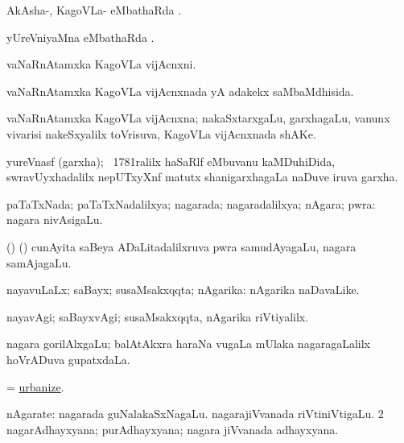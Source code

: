 \bentry
{} 
\gl{\sapUpa}
\expl{}
\bmng
AkAsha-, KagoVLa- eMbathaRda \sapUpa. 
\emng
\eentry

\bentry
{} 
\gl{\sapUpa}
\expl{}
\bmng
yUreVniyaMna eMbathaRda \sapUpa. 
\emng
\eentry

\bentry
{} 
\gl{\nA}
\expl{}
\bmng
vaNaRnAtamxka KagoVLa vijAcnxni. 
\emng
\eentry

\bentry
{} 
\gl{\gu}
\expl{}
\bmng
vaNaRnAtamxka KagoVLa vijAcnxnada yA adakekx saMbaMdhisida. 
\emng
\eentry

\bentry
{} 
\gl{\nA}
\expl{}
\bmng
vaNaRnAtamxka KagoVLa vijAcnxna; nakaSxtarxgaLu, garxhagaLu, \mo vanunx vivarisi nakeSxyalilx toVrisuva, KagoVLa vijAcnxnada shAKe. 
\emng
\eentry

\bentry
{} 
\gl{\nA}
\expl{}
\bmng
yureVnasf (garxha); \kirxsha\ 1781ralilx haSaRlf eMbuvanu kaMDuhiDida, swravUyxhadalilx nepUTxyXnf matutx shanigarxhagaLa naDuve iruva garxha. 
\emng
\eentry

\bentry
{} 
\gl{\gu}
\expl{}
\bmng
paTaTxNada; paTaTxNadalilxya; nagarada; nagaradalilxya; nAgara; pwra:  nagara nivAsigaLu. 
\emng
\eentry

\bentry
{}
\gl{\nA}
\expl{}
\bmng
(\birx) (\ca) cunAyita saBeya ADaLitadalilxruva pwra samudAyagaLu, nagara samAjagaLu. 
\emng
\eentry

\bentry
{} 
\gl{\gu}
\bmng
nayavuLaLx; saBayx; susaMsakxqqta; nAgarika:  nAgarika naDavaLike. 
\emng
\eentry

\bentry
{} 
\gl{\kirxvi}
\expl{}
\bmng
nayavAgi; saBayxvAgi; susaMsakxqqta, nAgarika riVtiyalilx. 
\emng
\eentry

\bentry
{}
\gl{\nA}
\expl{}
\bmng
nagara gorilAlxgaLu; balAtAkxra haraNa \mo vugaLa mUlaka nagaragaLalilx hoVrADuva gupatxdaLa. 
\emng
\eentry

\bentry
{} 
\gl{\sakirx}
\expl{}
\bmng
= \hyperlink{urbanize}{urbanize}. 
\emng
\eentry

\bentry
{} 
\gl{\nA}
\expl{}
\bmng
\bnum
{} nAgarate: 
\banum
{} nagarada guNalakaSxNagaLu. 
 nagarajiVvanada riVtiniVtigaLu. 
\eanum
\numie
\num{2} nagarAdhayxyana; purAdhayxyana; nagara jiVvanada adhayxyana. 
\enum
\emng
\eentry

